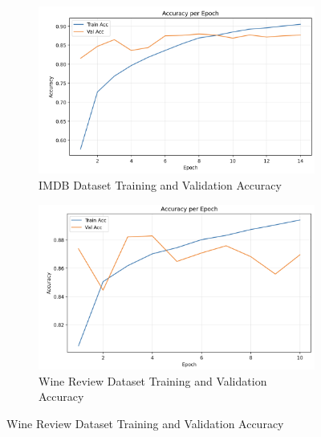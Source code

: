 \documentclass{article}
\begin{document}
\begin{figure}[htbp]
    \centering
    \begin{subfigure}{0.45\textwidth}
        \centering
        \includegraphics[width=\linewidth]{IMDB acc.png}
        \caption{IMDB Dataset Training and Validation Accuracy}
        \label{fig:imdb_acc}
    \end{subfigure}
    \hfill
    \begin{subfigure}{0.45\textwidth}
        \centering
        \includegraphics[width=\linewidth]{wine_acc.png}
        \caption{Wine Review Dataset Training and Validation Accuracy}
        \label{fig:wine_acc}
    \end{subfigure}
    
    \vspace{0.5cm} %
    

\end{figure}
\end{document}
